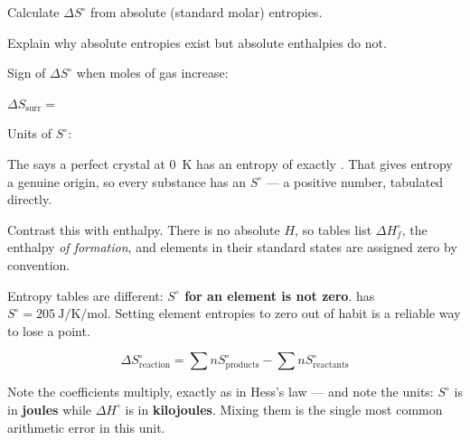 \documentclass{apchem-notes}
\begin{document}

\begin{objectives}
  \item Calculate $\Delta S^\circ$ from absolute (standard molar) entropies.
  \item Explain why absolute entropies exist but absolute enthalpies do not.
\end{objectives}


\begin{warmup}[3]
  \item Sign of $\Delta S^\circ$ when moles of gas increase:
  \item $\Delta S_{\text{surr}} = $ 
  \item Units of $S^\circ$: 
\end{warmup}



The  says a perfect crystal at
\SI{0}{\kelvin} has an entropy of exactly . That
gives entropy a genuine origin, so every substance has an
 $S^\circ$ --- a positive number, tabulated
directly.

\begin{apctrap}
Contrast this with enthalpy. There is no absolute $H$, so tables list
$\Delta H_f^\circ$, the enthalpy \emph{of formation}, and elements in their
standard states are assigned zero by convention.

Entropy tables are different: \textbf{$S^\circ$ for an element is not zero}.
 has $S^\circ = \SI{205}{\joule\per\kelvin\per\mole}$. Setting
element entropies to zero out of habit is a reliable way to lose a point.
\end{apctrap}

\[ \boxed{\;\Delta S^\circ_{\text{reaction}} = \sum n S^\circ_{\text{products}}
   - \sum n S^\circ_{\text{reactants}}\;} \]

Note the coefficients multiply, exactly as in Hess's law --- and note the
units: $S^\circ$ is in \textbf{joules} while $\Delta H^\circ$ is in
\textbf{kilojoules}. Mixing them is the single most common arithmetic error
in this unit.
\end{document}
